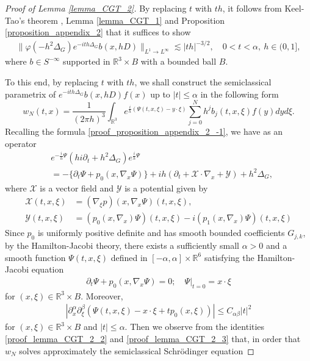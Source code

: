 \documentclass[10pt%
]{amsart}
\numberwithin{equation}{section}
\newcommand{\R}{\mathbb{R}}
\theoremstyle{definition}
\begin{document}
\begin{proof}[Proof of Lemma \ref{lemma_CGT_2}]
	By replacing $t$ with $th$, it follows from Keel-Tao's theorem \cite{KeelTao}, Lemma \ref{lemma_CGT_1} and Proposition \ref{proposition_appendix_2} that it suffices to show 
	\begin{align}
		\label{proof_lemma_CGT_2_1}
		\|\varphi(-h^2\Delta_G)e^{-ith\Delta_G}b(x,hD)\|_{L^1\to L^\infty}\lesssim |th|^{-3/2},\quad 0<t<\alpha,\ h\in (0,1],
	\end{align}
	where $b\in S^{-\infty}$ supported in $\R^3\times B$ with a bounded ball $B$. 
	
	To this end, by replacing $t$ with $th$, we shall construct the semiclassical parametrix of $e^{-ith\Delta_G}b(x,hD)f(x)$ up to $|t|\le \alpha$ in the following form
	$$
	w_N(t,x)=\frac{1}{(2\pi h)^{3}}\int_{\R^3}e^{\frac ih(\Psi(t,x,\xi)-y\cdot \xi)}\sum_{j=0}^Nh^j b_j(t,x,\xi)f(y)dyd\xi.
	$$
	Recalling the formula \eqref{proof_proposition_appendix_2_-1}, we have as an operator 
	\begin{align}
		\label{proof_lemma_CGT_2_2}
		&e^{-\frac ih\Psi}(hi\partial_t+h^2\Delta_G)e^{\frac ih\Psi}\\
		\nonumber
		&=-\{\partial_t \Psi+p_0(x,\nabla_x\Psi)\}+ih\left(\partial_t+\mathcal X\cdot \nabla_x+\mathcal Y\right)+h^2\Delta_G,
	\end{align}
	where $\mathcal X$ is a vector field and $\mathcal Y$ is a potential given by
	\begin{align*}
		\mathcal X(t,x,\xi)&=(\nabla_\xi p)(x,\nabla_x\Psi)(t,x,\xi),\\
		\mathcal Y(t,x,\xi)&=(p_0(x,\nabla_x)\Psi)(t,x,\xi)-i(p_1(x,\nabla_x)\Psi)(t,x,\xi)
	\end{align*}
	Since $p_0$ is uniformly positive definite and has smooth bounded coefficients $G_{j,k}$, by the Hamilton-Jacobi theory, there exists a sufficiently small $\alpha>0$ and a smooth function $\Psi(t,x,\xi)$ defined in $[-\alpha,\alpha]\times \R^6$ satisfying the Hamilton-Jacobi equation
	\begin{align}
		\label{proof_lemma_CGT_2_3}
		\partial_t \Psi+p_0(x,\nabla_x\Psi)=0;\quad \Psi|_{t=0}=x\cdot\xi
	\end{align}
	for $(x,\xi)\in \R^3\times B$. Moreover, 
	\begin{align}
		\label{proof_lemma_CGT_2_4}
		|\partial_x^\alpha\partial_\xi^\beta(\Psi(t,x,\xi)-x\cdot \xi+tp_0(x,\xi))|\le C_{\alpha\beta}|t|^2
	\end{align}
	for $(x,\xi)\in \R^3\times B$ and $|t|\le \alpha$. Then we observe from the identities \eqref{proof_lemma_CGT_2_2} and \eqref{proof_lemma_CGT_2_3} that, in order that $w_N$ solves approximately the semiclassical Schr\"odinger equation

\end{proof}
\end{document}
